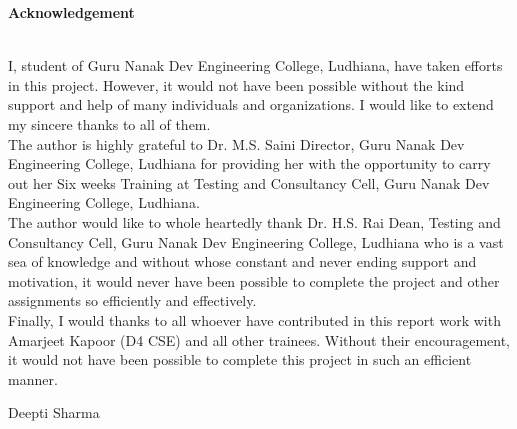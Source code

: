 \begin{center}
{\Huge \bf{Acknowledgement}\vskip 0.2in}
\end{center}
 \hrulefill \\

I, student of Guru Nanak Dev Engineering College, Ludhiana, have taken efforts in this project.
However, it would not have been possible without the kind support and help of many individuals
and organizations. I would like to extend my sincere thanks to all of them.\\

The author is highly grateful to Dr. M.S. Saini Director, Guru Nanak Dev Engineering College, Ludhiana for providing her with the opportunity to carry out her Six weeks Training at
Testing and Consultancy Cell, Guru Nanak Dev Engineering College, Ludhiana.\\

The author would like to whole heartedly thank Dr. H.S. Rai Dean, Testing and Consultancy
Cell, Guru Nanak Dev Engineering College, Ludhiana who is a vast sea of knowledge and without whose constant and never ending support and motivation, it would never have been possible to complete the project and other assignments so efficiently and effectively.\\

Finally, I would thanks to all whoever have contributed in this report work with Amarjeet Kapoor (D4 CSE)
and all other trainees. Without their encouragement, it would not have been possible
to complete this project in such an efficient manner.

\vskip 1.0cm 
\noindent Deepti Sharma



